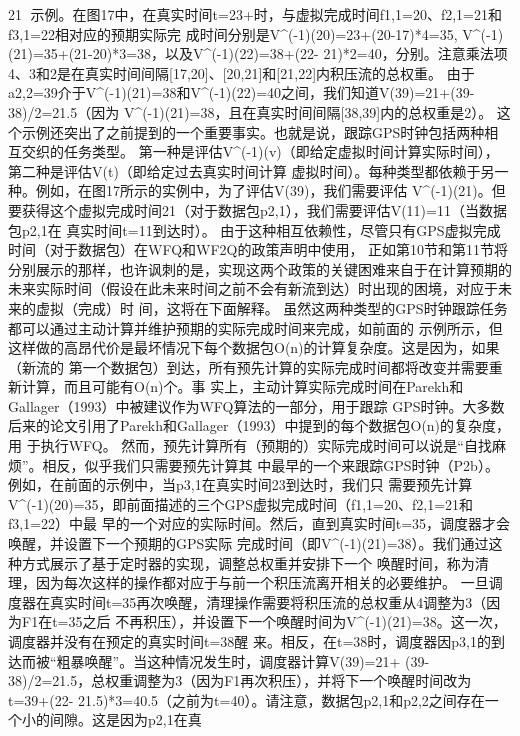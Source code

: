                                                                                21
示例。在图17中，在真实时间t=23+时，与虚拟完成时间f1,1=20、f2,1=21和f3,1=22相对应的预期实际完
成时间分别是V^(-1)(20)=23+(20-17)*4=35, V^(-1)(21)=35+(21-20)*3=38，以及V^(-1)(22)=38+(22-
21)*2=40，分别。注意乘法项4、3和2是在真实时间间隔[17,20]、[20,21]和[21,22]内积压流的总权重。
由于a2,2=39介于V^(-1)(21)=38和V^(-1)(22)=40之间，我们知道V(39)=21+(39-38)/2=21.5（因为
V^(-1)(21)=38，且在真实时间间隔[38,39]内的总权重是2）。
这个示例还突出了之前提到的一个重要事实。也就是说，跟踪GPS时钟包括两种相互交织的任务类型。
第一种是评估V^(-1)(v)（即给定虚拟时间计算实际时间），第二种是评估V(t)（即给定过去真实时间计算
虚拟时间）。每种类型都依赖于另一种。例如，在图17所示的实例中，为了评估V(39)，我们需要评估
V^(-1)(21)。但要获得这个虚拟完成时间21（对于数据包p2,1），我们需要评估V(11)=11（当数据包p2,1在
真实时间t=11到达时）。
由于这种相互依赖性，尽管只有GPS虚拟完成时间（对于数据包）在WFQ和WF2Q的政策声明中使用，
正如第10节和第11节将分别展示的那样，也许讽刺的是，实现这两个政策的关键困难来自于在计算预期的
未来实际时间（假设在此未来时间之前不会有新流到达）时出现的困境，对应于未来的虚拟（完成）时
间，这将在下面解释。
虽然这两种类型的GPS时钟跟踪任务都可以通过主动计算并维护预期的实际完成时间来完成，如前面的
示例所示，但这样做的高昂代价是最坏情况下每个数据包O(n)的计算复杂度。这是因为，如果（新流的
第一个数据包）到达，所有预先计算的实际完成时间都将改变并需要重新计算，而且可能有O(n)个。事
实上，主动计算实际完成时间在Parekh和Gallager（1993）中被建议作为WFQ算法的一部分，用于跟踪
GPS时钟。大多数后来的论文引用了Parekh和Gallager（1993）中提到的每个数据包O(n)的复杂度，用
于执行WFQ。
然而，预先计算所有（预期的）实际完成时间可以说是“自找麻烦”。相反，似乎我们只需要预先计算其
中最早的一个来跟踪GPS时钟（P2b）。例如，在前面的示例中，当p3,1在真实时间23到达时，我们只
需要预先计算V^(-1)(20)=35，即前面描述的三个GPS虚拟完成时间（f1,1=20、f2,1=21和f3,1=22）中最
早的一个对应的实际时间。然后，直到真实时间t=35，调度器才会唤醒，并设置下一个预期的GPS实际
完成时间（即V^(-1)(21)=38）。我们通过这种方式展示了基于定时器的实现，调整总权重并安排下一个
唤醒时间，称为清理，因为每次这样的操作都对应于与前一个积压流离开相关的必要维护。
一旦调度器在真实时间t=35再次唤醒，清理操作需要将积压流的总权重从4调整为3（因为F1在t=35之后
不再积压），并设置下一个唤醒时间为V^(-1)(21)=38。这一次，调度器并没有在预定的真实时间t=38醒
来。相反，在t=38时，调度器因p3,1的到达而被“粗暴唤醒”。当这种情况发生时，调度器计算V(39)=21+
(39-38)/2=21.5，总权重调整为3（因为F1再次积压），并将下一个唤醒时间改为t=39+(22-
21.5)*3=40.5（之前为t=40）。请注意，数据包p2,1和p2,2之间存在一个小的间隙。这是因为p2,1在真
